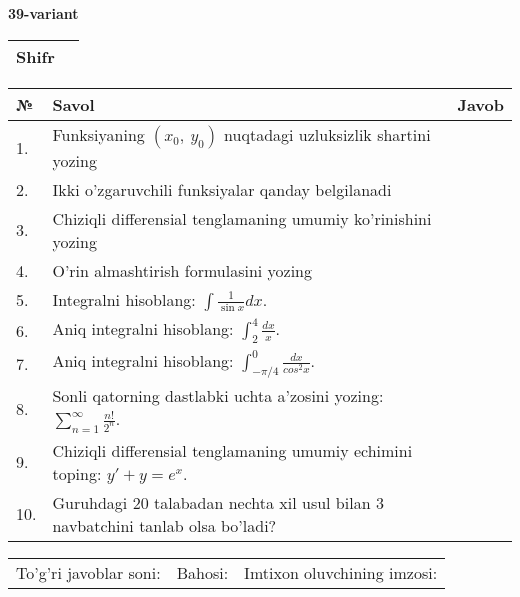 \documentclass{article}
\begin{document}
  \egroup
  
  \newpage
  
  
  \textbf{39-variant}\\
  
  \bgroup
  \def\arraystretch{1.6} %
  
  \begin{tabular}{|m{5.7cm}|m{9.5cm}|}
  \hline
  Shifr & \\
  \hline
  \end{tabular}
  
  \vspace{1cm}
  
  \begin{tabular}{|m{0.7cm}|m{10cm}|m{4cm}|}
  \hline
  № & Savol & Javob \\
  \hline
  1. & Funksiyaning \((x_{0},\ y_{0})\) nuqtadagi uzluksizlik shartini yozing &  \\
  \hline
  2. & Ikki o'zgaruvchili funksiyalar qanday belgilanadi &  \\
  \hline
  3. & Chiziqli differensial tenglamaning umumiy ko'rinishini yozing &  \\
  \hline
  4. & O'rin almashtirish formulasini yozing &  \\
  \hline
  5. & Integralni hisoblang: \(\int {\frac{1}{\sin x}dx}\). &  \\
  \hline
  6. & Aniq integralni hisoblang: \(\int_{2}^{4}\frac{dx}{x}\). &  \\
  \hline
  7. & Aniq integralni hisoblang: \(\int_{- \pi/4}^{0}\frac{dx}{cos^{2}x}\). &  \\
  \hline
  8. & Sonli qatorning dastlabki uchta a'zosini yozing: \(\sum_{n = 1}^{\infty}\frac{n!}{2^{n}}\). &  \\
  \hline
  9. & Chiziqli differensial tenglamaning umumiy echimini toping: \(y' + y = e^{x}\). &  \\
  \hline
  10. & Guruhdagi 20 talabadan nechta xil usul bilan 3 navbatchini tanlab olsa bo'ladi? &  \\
  \hline
  \end{tabular}
  
  \vspace{1cm}
  
  \begin{tabular}{lll}
  To'g'ri javoblar soni: \underline{\hspace{1.5cm}} & 
  Bahosi: \underline{\hspace{1.5cm}} & 
  Imtixon oluvchining imzosi: \underline{\hspace{2cm}} \\
  \end{tabular}
  
\end{document}
